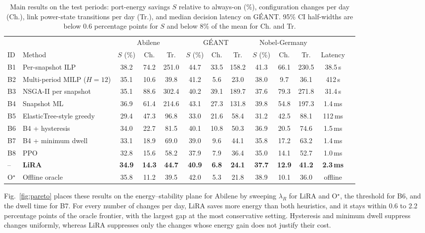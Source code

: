 \documentclass[conference]{IEEEtran}
\begin{document}
\begin{table}[t]
\centering
\caption{Main results on the test periods: port-energy savings $S$ relative to always-on (\%), configuration changes per day (Ch.), link power-state transitions per day (Tr.), and median decision latency on G\'{E}ANT. 95\% CI half-widths are below 0.6 percentage points for $S$ and below 8\% of the mean for Ch. and Tr.}
\label{tab:main}
\footnotesize
\setlength{\tabcolsep}{4.5pt}
\begin{tabular}{@{}llccccccccccc@{}}
\toprule
& & \multicolumn{3}{c}{Abilene} & \multicolumn{3}{c}{G\'{E}ANT} & \multicolumn{3}{c}{Nobel-Germany} & \\
\cmidrule(lr){3-5}\cmidrule(lr){6-8}\cmidrule(lr){9-11}
ID & Method & $S$ (\%) & Ch. & Tr. & $S$ (\%) & Ch. & Tr. & $S$ (\%) & Ch. & Tr. & Latency \\
\midrule
B1 & Per-snapshot ILP & 38.2 & 74.2 & 251.0 & 44.7 & 33.5 & 158.2 & 41.3 & 66.1 & 230.5 & 38.5\,s \\
B2 & Multi-period MILP ($H=12$) & 35.1 & 10.6 & 39.8 & 41.2 & 5.6 & 23.0 & 38.0 & 9.7 & 36.1 & 412\,s \\
B3 & NSGA-II per snapshot & 35.1 & 88.6 & 302.4 & 40.2 & 39.1 & 189.7 & 37.6 & 79.3 & 271.8 & 31.4\,s \\
B4 & Snapshot ML & 36.9 & 61.4 & 214.6 & 43.1 & 27.3 & 131.8 & 39.8 & 54.8 & 197.3 & 1.4\,ms \\
B5 & ElasticTree-style greedy & 29.4 & 47.3 & 96.8 & 33.0 & 21.6 & 58.4 & 31.2 & 42.5 & 88.1 & 112\,ms \\
B6 & B4 + hysteresis & 34.0 & 22.7 & 81.5 & 40.1 & 10.8 & 50.3 & 36.9 & 20.5 & 74.6 & 1.5\,ms \\
B7 & B4 + minimum dwell & 33.1 & 18.9 & 69.0 & 39.0 & 9.6 & 44.1 & 35.8 & 17.2 & 63.2 & 1.4\,ms \\
B8 & PPO & 32.8 & 15.6 & 58.2 & 37.9 & 7.9 & 36.4 & 35.0 & 14.1 & 52.7 & 1.0\,ms \\
\midrule
-- & \textbf{LiRA} & \textbf{34.9} & \textbf{14.3} & \textbf{44.7} & \textbf{40.9} & \textbf{6.8} & \textbf{24.1} & \textbf{37.7} & \textbf{12.9} & \textbf{41.2} & \textbf{2.3\,ms} \\
O$^\star$ & Offline oracle & 35.8 & 11.2 & 39.5 & 42.0 & 5.3 & 21.8 & 38.9 & 10.1 & 36.0 & offline \\
\bottomrule
\end{tabular}
\end{table}

Fig.~\ref{fig:pareto} places these results on the energy--stability plane for Abilene by sweeping $\lambda_R$ for LiRA and O$^\star$, the threshold for B6, and the dwell time for B7. For every number of changes per day, LiRA saves more energy than both heuristics, and it stays within 0.6 to 2.2 percentage points of the oracle frontier, with the largest gap at the most conservative setting. Hysteresis and minimum dwell suppress changes uniformly, whereas LiRA suppresses only the changes whose energy gain does not justify their cost.
\end{document}
